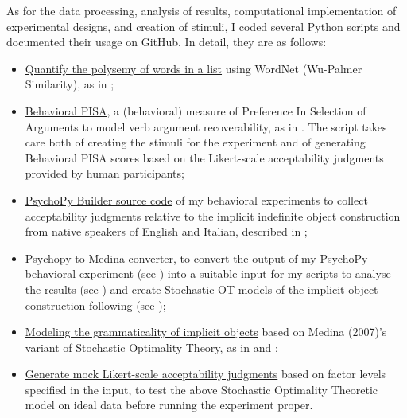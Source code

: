 As for the data processing, analysis of results, computational implementation of experimental designs, and creation of stimuli, I coded several Python scripts and documented their usage on GitHub. In detail, they are as follows:
\begin{itemize}    
    \item \href{https://github.com/giuliacappelli/checkPolysemy}{Quantify the polysemy of words in a list} using WordNet (Wu-Palmer Similarity), as in ;
    \item \href{https://github.com/giuliacappelli/behavioralPISA}{Behavioral PISA}, a (behavioral) measure of Preference In Selection of Arguments to model verb argument recoverability, as in . The script takes care both of creating the stimuli for the experiment and of generating Behavioral PISA scores based on the Likert-scale acceptability judgments provided by human participants;
    \item \href{https://github.com/giuliacappelli/psychopy_exps}{PsychoPy Builder source code} of my behavioral experiments to collect acceptability judgments relative to the implicit indefinite object construction from native speakers of English and Italian, described in ;
    \item \href{https://github.com/giuliacappelli/PsychopyToMedina}{Psychopy-to-Medina converter}, to convert the output of my PsychoPy behavioral experiment (see ) into a suitable input for my scripts to analyse the results (see ) and create Stochastic OT models of the implicit object construction following \textcite{Medina2007} (see );
    \item \href{https://github.com/giuliacappelli/MedinaStochasticOptimalityTheory}{Modeling the grammaticality of implicit objects} based on Medina (2007)'s variant of Stochastic Optimality Theory, as in  and ;
    \item \href{https://github.com/giuliacappelli/generateMockLikertGrammaticalityJudgments}{Generate mock Likert-scale acceptability judgments} based on factor levels specified in the input, to test the above Stochastic Optimality Theoretic model on ideal data before running the experiment proper.
\end{itemize}

